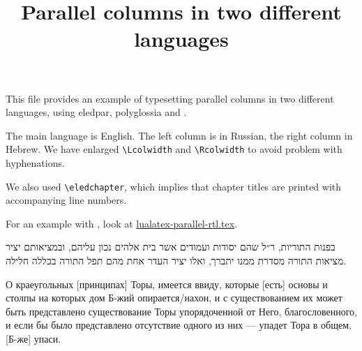 \documentclass{book}
\begin{document}
\title{Parallel columns in two different languages}



{\let\newpage\relax\maketitle}
{\small
This file provides an example of typesetting parallel columns in two different languages, using eledpar, polyglossia and \XeLaTeX.

The main language is English. The left column is in Russian, the right column in Hebrew.
We have enlarged \verb+\Lcolwidth+ and  \verb+\Rcolwidth+ to avoid problem with hyphenations.

We also used \verb+\eledchapter+, which implies that chapter titles are printed with accompanying line numbers. 

For an example with \LuaLaTeX, look at \href{./lualatex-parallel-rtl.tex}{lualatex-parallel-rtl.tex}.
}



\begin{pairs}

\begin{Rightside} 
\begin{RTL}
\begin{hebrew}
\beginnumbering
\pstart
{}
\pend
\pstart
בפנות התוריות, ר״ל שהם יסודות ועמודים אשר בית אלהים נכון עליהם, ובמציאותם יציר מציאות התורה מסדרת ממנו יתברך, ואלו יציר העדר אחת מהם תפל התורה בכללה חלילה.
\pend    
\endnumbering
\end{hebrew}
\end{RTL}
\end{Rightside}




\begin{Leftside} 
\begin{russian}
\beginnumbering
\pstart
{}   
\pend 
\pstart
О краеугольных [принципах] Торы, имеется ввиду, которые [есть] основы и столпы на которых дом Б-жий опирается/нахон, и с существованием их может быть представлено существование Торы упорядоченной от Него, благословенного, и если бы было представлено отсутствие одного из них — упадет Тора в общем, [Б-же] упаси.
\pend
\endnumbering
\end{russian}
\end{Leftside}

\end{pairs}
\Columns
\end{document}
